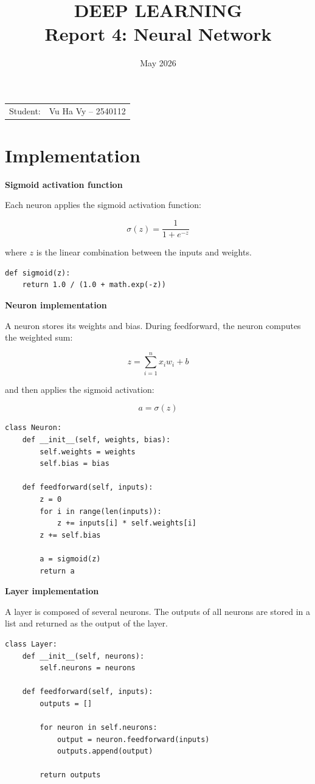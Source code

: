\documentclass{article}
\title{\textbf{DEEP LEARNING} \\
{\Large \textbf{Report 4: Neural Network}}}
\date{May 2026}
\begin{document}
\pagestyle{plain}
\maketitle

\noindent\begin{tabular}{@{}ll}
  Student: & Vu Ha Vy -- 2540112 \\
\end{tabular}

\section*{Implementation}

\textbf{Sigmoid activation function}

Each neuron applies the sigmoid activation function:

\[
\sigma(z) = \frac{1}{1 + e^{-z}}
\]

where \(z\) is the linear combination between the inputs and weights.

\begin{verbatim}
def sigmoid(z):
    return 1.0 / (1.0 + math.exp(-z))
\end{verbatim}

\textbf{Neuron implementation}

A neuron stores its weights and bias. During feedforward, the neuron
computes the weighted sum:

\[
z = \sum_{i=1}^{n} x_i w_i + b
\]

and then applies the sigmoid activation:

\[
a = \sigma(z)
\]

\begin{verbatim}
class Neuron:
    def __init__(self, weights, bias):
        self.weights = weights
        self.bias = bias
    
    def feedforward(self, inputs):  
        z = 0
        for i in range(len(inputs)):
            z += inputs[i] * self.weights[i]
        z += self.bias

        a = sigmoid(z)
        return a
\end{verbatim}

\textbf{Layer implementation}

A layer is composed of several neurons. The outputs of all neurons are
stored in a list and returned as the output of the layer.

\begin{verbatim}
class Layer:                  
    def __init__(self, neurons):
        self.neurons = neurons
    
    def feedforward(self, inputs): 
        outputs = []

        for neuron in self.neurons:
            output = neuron.feedforward(inputs)
            outputs.append(output)

        return outputs
\end{verbatim}
\end{document}
